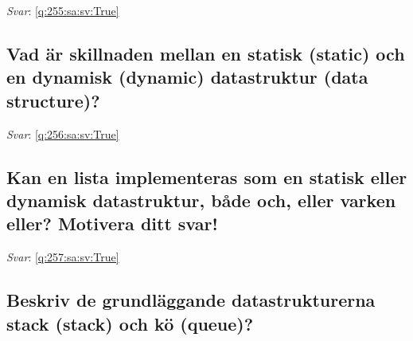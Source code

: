 \documentclass[a4paper,11pt,oneside]{article}
\begin{document}
\begin{sloppypar}
\vspace{2cm}

\noindent\makebox[\textwidth]{\hrulefill}

\vspace{1cm}

\textit{Svar}: \autoref{q:255:sa:sv:True}



\subsection{Vad \"ar skillnaden mellan en statisk (static) och en dynamisk (dynamic) datastruktur (data structure)?}

\label{q:256:sa:sv:False}

\vspace{2cm}

\noindent\makebox[\textwidth]{\hrulefill}

\vspace{1cm}

\textit{Svar}: \autoref{q:256:sa:sv:True}



\subsection{Kan en lista implementeras som en statisk eller dynamisk datastruktur, b\r{a}de och, eller varken eller? Motivera ditt svar!}

\label{q:257:sa:sv:False}

\vspace{2cm}

\noindent\makebox[\textwidth]{\hrulefill}

\vspace{1cm}

\textit{Svar}: \autoref{q:257:sa:sv:True}



\subsection{Beskriv de grundl\"aggande datastrukturerna stack (stack) och k\"o (queue)?}

\label{q:258:sa:sv:False}

\vspace{2cm}

\noindent\makebox[\textwidth]{\hrulefill}

\vspace{1cm}


\end{sloppypar}
\end{document}
